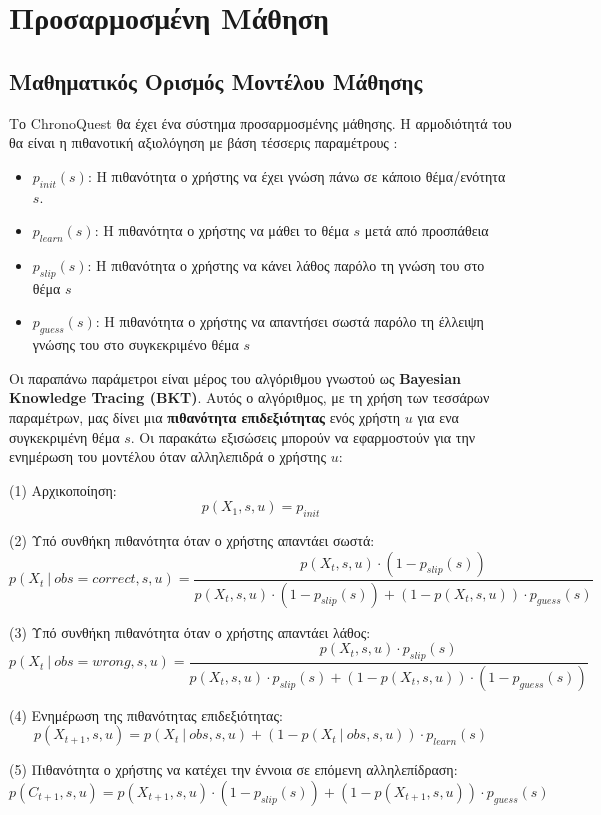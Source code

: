\section{Προσαρμοσμένη Μάθηση}
\subsection{Μαθηματικός Ορισμός Μοντέλου Μάθησης}
Το \textlatin{ChronoQuest} θα έχει ένα σύστημα προσαρμοσμένης μάθησης. Η αρμοδιότητά του θα είναι η πιθανοτική αξιολόγηση με βάση τέσσερις παραμέτρους \cite{bkt_wiki}:
\begin{itemize}
    \item \textbf{$p_{init}(s)$}: Η πιθανότητα ο χρήστης να έχει γνώση πάνω σε κάποιο θέμα/ενότητα \textbf{$s$}.
    \item \textbf{$p_{learn}(s)$}: Η πιθανότητα ο χρήστης να μάθει το θέμα $s$ μετά από προσπάθεια
    \item \textbf{$p_{slip}(s)$}: Η πιθανότητα ο χρήστης να κάνει λάθος παρόλο τη γνώση του στο θέμα $s$
    \item \textbf{$p_{guess}(s)$}: Η πιθανότητα ο χρήστης να απαντήσει σωστά παρόλο τη έλλειψη γνώσης του στο συγκεκριμένο θέμα $s$
\end{itemize}

Οι παραπάνω παράμετροι είναι μέρος του αλγόριθμου γνωστού ως \textlatin{\textbf{Bayesian Knowledge Tracing (BKT)}}. Αυτός ο αλγόριθμος, με τη χρήση των τεσσάρων παραμέτρων, μας δίνει μια \textbf{πιθανότητα επιδεξιότητας} ενός χρήστη $u$ για ενα συγκεκριμένη θέμα $s$. Οι παρακάτω εξισώσεις μπορούν να εφαρμοστούν για την ενημέρωση του μοντέλου όταν αλληλεπιδρά ο χρήστης $u$:

(1) Αρχικοποίηση:
$$p(X_1, s, u) = p_{init}$$

(2) Υπό συνθήκη πιθανότητα όταν ο χρήστης απαντάει σωστά:
$$p(X_t\ |\ obs = correct, s, u) = \frac{p(X_t, s, u) \cdot (1 - p_{slip}(s))}{p(X_t,s,u) \cdot (1 - p_{slip}(s)) + (1 - p(X_t, s, u)) \cdot p_{guess}(s) }$$

(3) Υπό συνθήκη πιθανότητα όταν ο χρήστης απαντάει λάθος:
$$p (X_t\ |\ obs = wrong, s, u) = \frac{p(X_t, s, u) \cdot p_{slip}(s)}{p(X_t,s,u) \cdot p_{slip}(s) + (1 - p(X_t, s, u)) \cdot (1 - p_{guess}(s)) }$$

(4) Ενημέρωση της πιθανότητας επιδεξιότητας:
$$p(X_{t+1}, s, u) = p(X_t\ |\ obs, s, u) + (1 - p(X_t\ |\ obs, s, u)) \cdot p_{learn}(s)$$

(5) Πιθανότητα ο χρήστης να κατέχει την έννοια σε επόμενη αλληλεπίδραση:
$$p(C_{t+1}, s, u) = p(X_{t+1}, s, u) \cdot (1 - p_{slip}(s)) + (1 - p(X_{t+1}, s, u)) \cdot p_{guess}(s)$$

